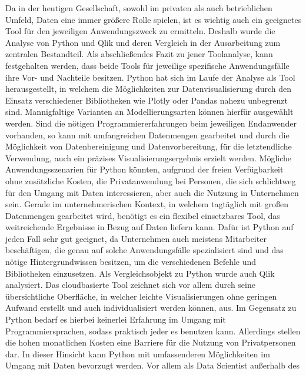\documentclass[12pt]{article}
\begin{document}
	Da in der heutigen Gesellschaft, sowohl im privaten als auch betrieblichen Umfeld,
	Daten eine immer größere Rolle spielen, ist es wichtig auch ein geeignetes Tool für den
	jeweiligen Anwendungszweck zu ermitteln.
	Deshalb wurde die Analyse von Python und Qlik und deren Vergleich in der Ausarbeitung
	zum zentralen Bestandteil.
	Als abschließendes Fazit zu jener Toolanalyse, kann festgehalten werden, dass beide
	Tools für jeweilige spezifische Anwendungsfälle ihre Vor- und Nachteile besitzen.
	Python hat sich im Laufe der Analyse als Tool herausgestellt, in welchem die
	Möglichkeiten zur Datenvisualisierung durch den Einsatz verschiedener Bibliotheken wie
	Plotly oder Pandas nahezu unbegrenzt sind.
	Mannigfaltige Varianten an Modellierungsarten können hierfür ausgewählt werden.
	Sind die nötigen Programmiererfahrungen beim jeweiligen Endanwender vorhanden, so
	kann mit umfangreichen Datenmengen gearbeitet und durch die Möglichkeit von
	Datenbereinigung und Datenvorbereitung, für die letztendliche Verwendung, auch ein
	präzises Visualisierungsergebnis erzielt werden.
	Mögliche Anwendungsszenarien für Python könnten, aufgrund der freien Verfügbarkeit
	ohne zusätzliche Kosten, die Privatanwendung bei Personen, die sich schlichtweg für
	den Umgang mit Daten interessieren, aber auch die Nutzung in Unternehmen sein.
	Gerade im unternehmerischen Kontext, in welchem tagtäglich mit großen Datenmengen
	gearbeitet wird, benötigt es ein flexibel einsetzbares Tool, das weitreichende Ergebnisse
	in Bezug auf Daten liefern kann. Dafür ist Python auf jeden Fall sehr gut geeignet, da
	Unternehmen auch meistens Mitarbeiter beschäftigen, die genau auf solche
	Anwendungsfälle spezialisiert sind und das nötige Hintergrundwissen besitzen, um die
	verschiedenen Befehle und Bibliotheken einzusetzen.
	Als Vergleichsobjekt zu Python wurde auch Qlik analysiert. Das cloudbasierte Tool
	zeichnet sich vor allem durch seine übersichtliche Oberfläche, in welcher leichte
	Visualisierungen ohne geringen Aufwand erstellt und auch individualisiert werden
	können, aus. Im Gegensatz zu Python bedarf es hierbei keinerlei Erfahrung im Umgang
	mit Programmiersprachen, sodass praktisch jeder es benutzen kann.
	Allerdings stellen die hohen monatlichen Kosten eine Barriere für die Nutzung von
	Privatpersonen dar. In dieser Hinsicht kann Python mit umfassenderen Möglichkeiten im
	Umgang mit Daten bevorzugt werden. Vor allem als Data Scientist außerhalb des
	
\end{document}
